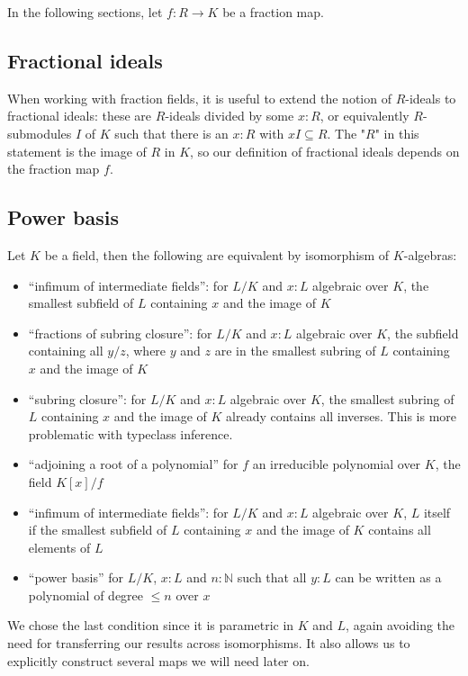 \documentclass{lipics-v2021}
\newcommand{\N}{\mathbb{N}}
\begin{document}
In the following sections, let $f : R \to K$ be a fraction map.

\subsection{Fractional ideals}

When working with fraction fields, it is useful to extend the notion of $R$-ideals to fractional ideals: these are $R$-ideals divided by some $x : R$, or equivalently $R$-submodules $I$ of $K$ such that there is an $x : R$ with $x I \subseteq R$. The "$R$" in this statement is the image of $R$ in $K$, so our definition of fractional ideals depends on the fraction map $f$.

\subsection{Power basis}

Let $K$ be a field, then the following are equivalent by isomorphism of $K$-algebras:
\begin{itemize}
 \item ``infimum of intermediate fields'': for $L / K$ and $x : L$ algebraic over $K$, the smallest subfield of $L$ containing $x$ and the image of $K$
 \item ``fractions of subring closure'': for $L / K$ and $x : L$ algebraic over $K$, the subfield containing all $y / z$, where $y$ and $z$ are in the smallest subring of $L$ containing $x$ and the image of $K$
 \item ``subring closure'': for $L / K$ and $x : L$ algebraic over $K$, the smallest subring of $L$ containing $x$ and the image of $K$ already contains all inverses. This is more problematic with typeclass inference.
 \item ``adjoining a root of a polynomial'' for $f$ an irreducible polynomial over $K$, the field $K[x] / f$
 \item ``infimum of intermediate fields'': for $L / K$ and $x : L$ algebraic over $K$, $L$ itself if the smallest subfield of $L$ containing $x$ and the image of $K$ contains all elements of $L$
 \item ``power basis'' for $L / K$, $x : L$ and $n : \N$ such that all $y : L$ can be written as a polynomial of degree $\le n$ over $x$
\end{itemize}

We chose the last condition since it is parametric in $K$ and $L$, again avoiding the need for transferring our results across isomorphisms. It also allows us to explicitly construct several maps we will need later on.
\end{document}
